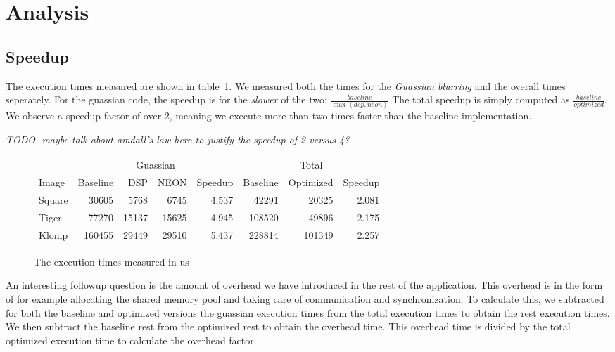 \section{Analysis}
\subsection{Speedup}
The execution times measured are shown in table~\ref{tab:exectimes}. We measured both the times for the \emph{Guassian blurring} and the overall times seperately. For the guassian code, the speedup is for the \emph{slower} of the two: $\frac{baseline}{\max(dsp,neon)}$ The total speedup is simply computed as $\frac{baseline}{optimized}$. We observe a speedup factor of over 2, meaning we execute more than two times faster than the baseline implementation.

\emph{TODO, maybe talk about amdall's law here to justify the speedup of 2 versus 4?}

\begin{figure}[h]
\centering
\begin{tabular}{l | r r r r | r r r}
        & \multicolumn{4}{|c|}{Guassian}                & \multicolumn{3}{|c}{Total}                \\
Image   & Baseline  & DSP   & NEON          & Speedup   & Baseline  & Optimized         & Speedup   \\
\hline
Square  & 30605     & 5768  & 6745          & 4.537     & 42291     & 20325             & 2.081     \\
Tiger   & 77270     & 15137 & 15625         & 4.945     & 108520    & 49896             & 2.175     \\
Klomp   & 160455    & 29449 & 29510         & 5.437     & 228814    & 101349            & 2.257     \\
\end{tabular}
\caption{The execution times measured in us}
\label{tab:exectimes}
\end{figure}


An interesting followup question is the amount of overhead we have introduced in the rest of the application. This overhead is in the form of for example allocating the shared memory pool and taking care of communication and synchronization. To calculate this, we subtracted for both the baseline and optimized versions the guassian execution times from the total execution times to obtain the rest execution times. We then subtract the baseline rest from the optimized rest to obtain the overhead time. This overhead time is divided by the total optimized execution time to calculate the overhead factor.

